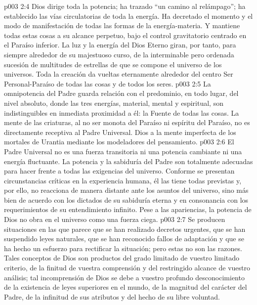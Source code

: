 \vs p003 2:4 Dios dirige toda la potencia; ha trazado “un camino al relámpago”; ha establecido las vías circulatorias de toda la energía. Ha decretado el momento y el modo de manifestación de todas las formas de la energía\hyp{}materia. Y mantiene todas estas cosas a su alcance perpetuo, bajo el control gravitatorio centrado en el Paraíso inferior. La luz y la energía del Dios Eterno giran, por tanto, para siempre alrededor de su majestuoso curso, de la interminable pero ordenada sucesión de multitudes de estrellas de que se compone el universo de los universos. Toda la creación da vueltas eternamente alrededor del centro Ser Personal\hyp{}Paraíso de todas las cosas y de todos los seres.
\vs p003 2:5 La omnipotencia del Padre guarda relación con el predominio, en todo lugar, del nivel absoluto, donde las tres energías, material, mental y espiritual, son indistinguibles en inmediata proximidad a él: la Fuente de todas las cosas. La mente de las criaturas, al no ser monota del Paraíso ni espíritu del Paraíso, no es directamente receptiva al Padre Universal. Dios  a la mente imperfecta de los mortales de Urantia mediante los modeladores del pensamiento.
\vs p003 2:6 \pc El Padre Universal no es una fuerza transitoria ni una potencia cambiante ni una energía fluctuante. La potencia y la sabiduría del Padre son totalmente adecuadas para hacer frente a todas las exigencias del universo. Conforme se presentan circunstancias críticas en la experiencia humana, él las tiene todas previstas y, por ello, no reacciona de manera distante ante los asuntos del universo, sino más bien de acuerdo con los dictados de su sabiduría eterna y en consonancia con los requerimientos de su entendimiento infinito. Pese a las apariencias, la potencia de Dios no obra en el universo como una fuerza ciega.
\vs p003 2:7 Se producen situaciones en las que parece que se han realizado decretos urgentes, que se han suspendido leyes naturales, que se han reconocido fallos de adaptación y que se ha hecho un esfuerzo para rectificar la situación; pero estas no son las razones. Tales conceptos de Dios son productos del grado limitado de vuestro limitado criterio, de la finitud de vuestra comprensión y del restringido alcance de vuestro análisis; tal incomprensión de Dios se debe a vuestro profundo desconocimiento de la existencia de leyes superiores en el mundo, de la magnitud del carácter del Padre, de la infinitud de sus atributos y del hecho de su libre voluntad.
